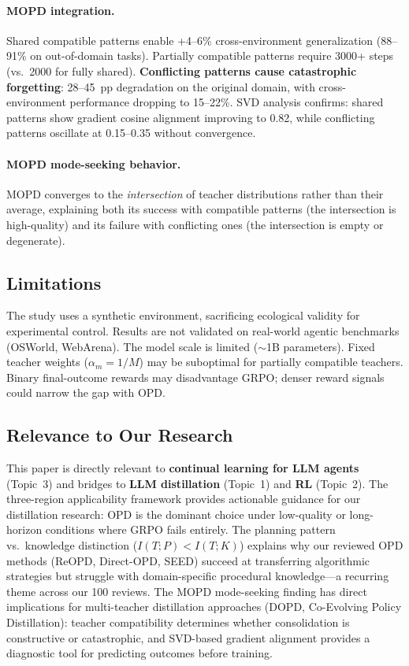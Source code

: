 \documentclass[11pt,a4paper]{article}
\begin{document}
\paragraph{MOPD integration.}
Shared compatible patterns enable +4--6\% cross-environment generalization (88--91\% on out-of-domain tasks). Partially compatible patterns require 3000+ steps (vs.\ 2000 for fully shared). \textbf{Conflicting patterns cause catastrophic forgetting}: 28--45~pp degradation on the original domain, with cross-environment performance dropping to 15--22\%. SVD analysis confirms: shared patterns show gradient cosine alignment improving to 0.82, while conflicting patterns oscillate at 0.15--0.35 without convergence.

\paragraph{MOPD mode-seeking behavior.}
MOPD converges to the \emph{intersection} of teacher distributions rather than their average, explaining both its success with compatible patterns (the intersection is high-quality) and its failure with conflicting ones (the intersection is empty or degenerate).

\subsection{Limitations}

The study uses a synthetic environment, sacrificing ecological validity for experimental control. Results are not validated on real-world agentic benchmarks (OSWorld, WebArena). The model scale is limited ($\sim$1B parameters). Fixed teacher weights ($\alpha_m = 1/M$) may be suboptimal for partially compatible teachers. Binary final-outcome rewards may disadvantage GRPO; denser reward signals could narrow the gap with OPD.

\subsection{Relevance to Our Research}

This paper is directly relevant to \textbf{continual learning for LLM agents} (Topic~3) and bridges to \textbf{LLM distillation} (Topic~1) and \textbf{RL} (Topic~2). The three-region applicability framework provides actionable guidance for our distillation research: OPD is the dominant choice under low-quality or long-horizon conditions where GRPO fails entirely. The planning pattern vs.\ knowledge distinction ($I(T;P) < I(T;K)$) explains why our reviewed OPD methods (ReOPD, Direct-OPD, SEED) succeed at transferring algorithmic strategies but struggle with domain-specific procedural knowledge---a recurring theme across our 100 reviews. The MOPD mode-seeking finding has direct implications for multi-teacher distillation approaches (DOPD, Co-Evolving Policy Distillation): teacher compatibility determines whether consolidation is constructive or catastrophic, and SVD-based gradient alignment provides a diagnostic tool for predicting outcomes before training.
\end{document}
